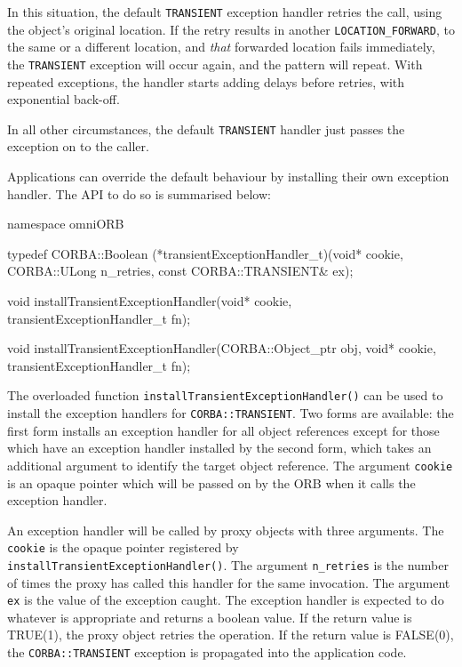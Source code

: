 \documentclass[11pt,twoside,a4paper]{book}
\newcommand{\code}[1]{\texttt{#1}}
\newcommand{\op}[1]{\texttt{#1()}}
\begin{document}
In this situation, the default \code{TRANSIENT} exception handler
retries the call, using the object's original location. If the retry
results in another \code{LOCATION\_FORWARD}, to the same or a
different location, and \emph{that} forwarded location fails
immediately, the \code{TRANSIENT} exception will occur again, and the
pattern will repeat. With repeated exceptions, the handler starts
adding delays before retries, with exponential back-off.

In all other circumstances, the default \code{TRANSIENT} handler just
passes the exception on to the caller.

Applications can override the default behaviour by installing their
own exception handler. The API to do so is summarised below:

\begin{cxxlisting}
namespace omniORB {
  
typedef CORBA::Boolean (*transientExceptionHandler_t)(void* cookie,
                                                CORBA::ULong n_retries,
                                                const CORBA::TRANSIENT& ex);

void installTransientExceptionHandler(void* cookie,
                                      transientExceptionHandler_t fn);

void installTransientExceptionHandler(CORBA::Object_ptr obj,
                                      void* cookie,
                                      transientExceptionHandler_t fn);
  
}
\end{cxxlisting}

The overloaded function \op{installTransientExceptionHandler} can be
used to install the exception handlers for \code{CORBA::TRANSIENT}.
Two forms are available: the first form installs an exception handler
for all object references except for those which have an exception
handler installed by the second form, which takes an additional
argument to identify the target object reference. The argument
\code{cookie} is an opaque pointer which will be passed on by the ORB
when it calls the exception handler.

An exception handler will be called by proxy objects with three
arguments. The \code{cookie} is the opaque pointer registered by
\op{installTransientExceptionHandler}. The argument \code{n\_retries}
is the number of times the proxy has called this handler for the same
invocation. The argument \code{ex} is the value of the exception
caught.  The exception handler is expected to do whatever is
appropriate and returns a boolean value. If the return value is
TRUE(1), the proxy object retries the operation. If the return value
is FALSE(0), the \code{CORBA::TRANSIENT} exception is propagated into
the application code.
\end{document}
